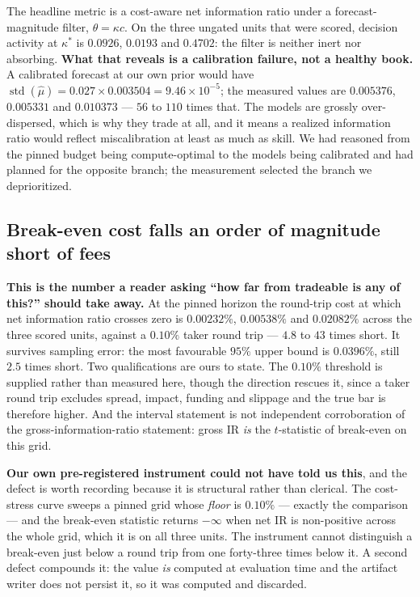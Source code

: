 The headline metric is a cost-aware net information ratio under a forecast-magnitude filter,
$\theta = \kappa c$. On the three ungated units that were scored, decision activity at
$\kappa^\ast$ is $0.0926$, $0.0193$ and $0.4702$: the filter is neither inert nor absorbing.
\textbf{What that reveals is a calibration failure, not a healthy book.} A calibrated forecast at
our own prior would have $\operatorname{std}(\hat{\mu}) = 0.027 \times 0.003504 = 9.46\times
10^{-5}$; the measured values are $0.005376$, $0.005331$ and $0.010373$ --- $56$ to $110$ times
that. The models are grossly over-dispersed, which is why they trade at all, and it means a
realized information ratio would reflect miscalibration at least as much as skill. We had reasoned
from the pinned budget being compute-optimal to the models being calibrated and had planned for the
opposite branch; the measurement selected the branch we deprioritized.

\subsection{Break-even cost falls an order of magnitude short of fees}
\label{sec:lim-breakeven}

\textbf{This is the number a reader asking ``how far from tradeable is any of this?'' should
take away.} At the pinned horizon the round-trip cost at which net information ratio crosses zero
is $0.00232\%$, $0.00538\%$ and $0.02082\%$ across the three scored units, against a $0.10\%$ taker
round trip --- $4.8$ to $43$ times short. It survives sampling error: the most favourable $95\%$
upper bound is $0.0396\%$, still $2.5$ times short. Two qualifications are ours to state. The
$0.10\%$ threshold is supplied rather than measured here, though the direction rescues it, since a
taker round trip excludes spread, impact, funding and slippage and the true bar is therefore
higher. And the interval statement is not independent corroboration of the gross-information-ratio
statement: gross IR \emph{is} the $t$-statistic of break-even on this grid.

\textbf{Our own pre-registered instrument could not have told us this}, and the defect is worth
recording because it is structural rather than clerical. The cost-stress curve sweeps a pinned grid
whose \emph{floor} is $0.10\%$ --- exactly the comparison --- and the break-even statistic returns
$-\infty$ when net IR is non-positive across the whole grid, which it is on all three units. The
instrument cannot distinguish a break-even just below a round trip from one forty-three times
below it. A second defect compounds it: the value \emph{is} computed at evaluation time and the
artifact writer does not persist it, so it was computed and discarded.

